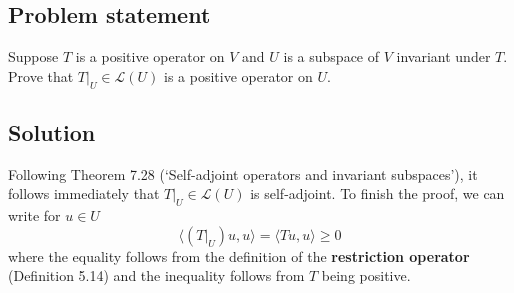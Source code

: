 \documentclass{article}
\begin{document}
\subsection*{Problem statement}
Suppose $T$ is a positive operator on $V$ and $U$ is a subspace of $V$ invariant under $T$. Prove that $T|_U\in\mathcal{L}(U)$ is a positive operator on $U$.

\subsection*{Solution}
Following Theorem 7.28 (`Self-adjoint operators and invariant subspaces'), it follows immediately that $T|_U\in\mathcal{L}(U)$ is self-adjoint. To finish the proof, we can write for $u\in U$
\[\langle (T|_U)u,u\rangle=\langle Tu,u\rangle\geq 0\]
where the equality follows from the definition of the \textbf{restriction operator} (Definition 5.14) and the inequality follows from $T$ being positive.

\clearpage
\end{document}
